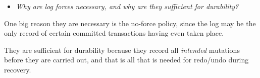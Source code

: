 \begin{itemize}
  \item \textit{Why are log forces necessary, and why are they sufficient for
    durability?}
\end{itemize}

One big reason they are necessary is the no-force policy, since the log may be
the only record of certain committed transactions having even taken place.

They are sufficient for durability because they record all \textit{intended}
mutations before they are carried out, and that is all that is needed for
redo/undo during recovery.

\tykstreg
